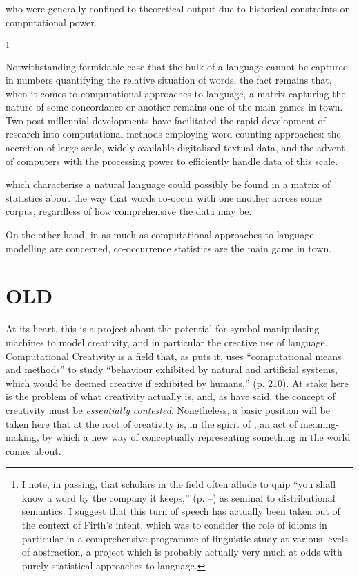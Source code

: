 who were generally confined to theoretical output due to historical constraints on computational power.

\footnote{I note, in passing, that scholars in the field often allude to  quip ``you shall know a word by the company it keeps,'' (p. --) as seminal to distributional semantics.  I suggest that this turn of speech has actually been taken out of the context of Firth's intent, which was to consider the role of idioms in particular in a comprehensive programme of linguistic study at various levels of abstraction, a project which is probably actually very much at odds with purely statistical approaches to language.}

Notwithstanding  formidable case that the bulk of a language cannot be captured in numbers quantifying the relative situation of words, the fact remains that, when it comes to computational approaches to language, a matrix capturing the nature of some concordance or another remains one of the main games in town.  Two post-millennial developments have facilitated the rapid development of research into computational methods employing word counting approaches: the accretion of large-scale, widely available digitalised textual data, and the advent of computers with the processing power to efficiently handle data of this scale.

which characterise a natural language could possibly be found in a matrix of statistics about the way that words co-occur with one another across some corpus, regardless of how comprehensive the data may be.

On the other hand, in as much as computational approaches to language modelling are concerned, co-occurrence statistics are the main game in town.

\section{OLD}
At its heart, this is a project about the potential for symbol manipulating machines to model creativity, and in particular the creative use of language.  Computational Creativity is a field that, as \cite{Wiggins2006b} puts it, uses ``computational means and methods'' to study ``behaviour exhibited by natural and artificial systems, which would be deemed creative if exhibited by humans,'' (p. 210).  At stake here is the problem of what creativity actually is, and, as \cite{Colton} have said, the concept of creativity must be \emph{essentially contested}.  Nonetheless, a basic position will be taken here that at the root of creativity is, in the spirit of \cite{Wittgenstein1953}, an act of meaning-making, by which a new way of conceptually representing something in the world comes about.

